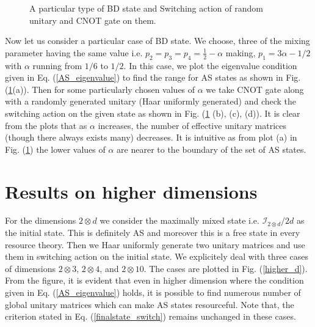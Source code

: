 \begin{figure}[htp]
{\qquad
{}}
\caption{\footnotesize{A particular type of BD state and Switching action of random unitary and CNOT gate on them.}}
\label{BD_random}
\end{figure}

Now let us consider a particular case of BD state. We choose, three of the mixing parameter having the same value i.e. $p_2=p_3=p_4=\frac{1}{2}-\alpha$ making, $p_1=3\alpha-1/2$ with $\alpha$ running from $1/6$ to $1/2$. In this case, we plot the eigenvalue condition given in Eq. (\ref{AS_eigenvalue}) to find the range for AS states as shown in Fig. (\ref{BD_random}(a)). Then for some particularly chosen values of $\alpha$ we take CNOT gate along with a randomly generated unitary (Haar uniformly generated) and check the switching action on the given state as shown in Fig. (\ref{BD_random} (b), (c), (d)). It is clear from the plots that as $\alpha$ increases, the number of effective unitary matrices (though there always exists many) decreases. It is intuitive as from plot (a) in Fig. (\ref{BD_random}) the lower values of $\alpha$ are nearer to the boundary of the set of AS states. 





\section*{Results on higher dimensions}
\noindent  For the dimensions $2\otimes d$ we consider the maximally mixed state i.e. $\mathcal{I}_{2\otimes d}/2d$ as the initial state. This is definitely AS and moreover this is a free state in every resource theory. Then we Haar uniformly generate two unitary matrices and use them in switching action on the initial state. We explicitely deal with three cases of dimensions $2\otimes 3$, $2 \otimes 4$, and $2 \otimes 10$. The cases are plotted in Fig. (\ref{higher_d}). From the figure, it is evident that even in higher dimension where the condition given in Eq. (\ref{AS_eigenvalue}) holds, it is possible to find numerous number of global unitary matrices which can make AS states resourceful. Note that, the criterion stated in Eq. (\ref{finalstate_switch}) remains unchanged in these cases. 

